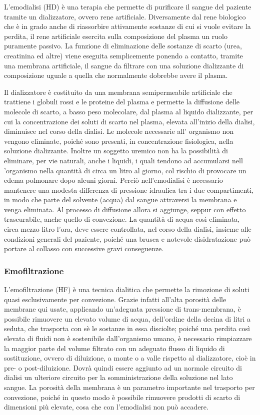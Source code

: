 L'emodialisi (HD) è una terapia che permette di purificare il sangue del paziente tramite un dializzatore, ovvero rene artificiale. Diversamente dal rene biologico che è in grado anche di riassorbire attivamente sostanze di cui si vuole evitare la perdita, il rene artificiale esercita sulla composizione del plasma un ruolo puramente passivo. La funzione di eliminazione delle sostanze di scarto (urea, creatinina ed altre) viene eseguita semplicemente ponendo a contatto, tramite una membrana artificiale, il sangue da filtrare con una soluzione dializzante di composizione uguale a quella che normalmente dobrebbe avere il plasma.

Il dializzatore è costituito da una membrana semipermeabile artificiale che trattiene i globuli rossi e le proteine del plasma e permette la diffusione delle molecole di scarto, a basso peso molecolare, dal plasma al liquido dializzante, per cui la concentrazione dei soluti di scarto nel plasma, elevata all'inizio della dialisi, diminuisce nel corso della dialisi. Le molecole necessarie all' organismo non vengono eliminate, poiché sono presenti, in concentrazione fisiologica, nella soluzione dializzante. Inoltre un soggetto uremico non ha la possibilità di eliminare, per vie naturali, anche i liquidi, i quali tendono ad accumularsi nell 'organismo nella quantità di circa un litro al giorno, col rischio di provocare un edema polmonare dopo alcuni giorni. Perciò nell'emodialisi è necessario mantenere una modesta differenza di pressione idraulica tra i due compartimenti, in modo che parte del solvente (acqua) dal sangue attraversi la membrana e venga eliminata. Al processo di diffusione allora si aggiunge, seppur con effetto trascurabile,  anche quello di convezione. La quantità di acqua così eliminata, circa mezzo litro l'ora, deve essere controllata, nel corso della dialisi, insieme alle condizioni generali del paziente, poiché una brusca e notevole disidratazione può portare al collasso con successive gravi conseguenze.

\subsubsection{Emofiltrazione}
L'emofiltrazione (HF) è una tecnica dialitica che permette la rimozione di soluti quasi esclusivamente per convezione. Grazie infatti all'alta porosità delle membrane qui usate, applicando un'adeguata pressione di trans-membrana, è possibile rimuovere un elevato volume di acqua, dell'ordine della decina di litri a seduta, che trasporta con sè le sostanze in essa disciolte; poiché una perdita così elevata di fluidi non è sostenibile dall'organismo umano, è necessario rimpiazzare la maggior parte del volume filtrato con un adeguato flusso di liquido di sostituzione, ovvero di diluizione, a monte o a valle rispetto al dializzatore, cioè in pre- o post-diluizione. Dovrà quindi essere aggiunto ad un normale circuito di dialisi un ulteriore circuito per la somministrazione della soluzione nel lato sangue. La porosità della membrana è un parametro importante nel trasporto per convezione, poiché in questo modo è possibile rimuovere prodotti di scarto di dimensioni più elevate, cosa che con l'emodialisi non può accadere.

